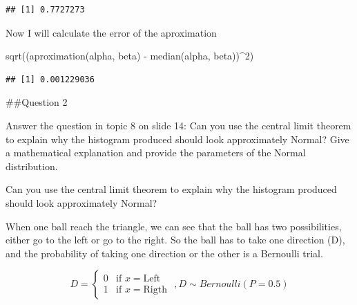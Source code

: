 \documentclass[
]{article}
\newenvironment{Shaded}{\begin{snugshade}}{\end{snugshade}}
\newcommand{\DecValTok}[1]{\textcolor[rgb]{0.00,0.00,0.81}{#1}}
\newcommand{\FunctionTok}[1]{\textcolor[rgb]{0.00,0.00,0.00}{#1}}
\newcommand{\NormalTok}[1]{#1}
\newcommand{\SpecialCharTok}[1]{\textcolor[rgb]{0.00,0.00,0.00}{#1}}
\begin{document}
\begin{verbatim}
## [1] 0.7727273
\end{verbatim}

Now I will calculate the error of the aproximation

\begin{Shaded}
\begin{Highlighting}[]
\FunctionTok{sqrt}\NormalTok{((}\FunctionTok{aproximation}\NormalTok{(alpha, beta) }\SpecialCharTok{{-}} \FunctionTok{median}\NormalTok{(alpha, beta))}\SpecialCharTok{\^{}}\DecValTok{2}\NormalTok{) }
\end{Highlighting}
\end{Shaded}

\begin{verbatim}
## [1] 0.001229036
\end{verbatim}

\#\#Question 2

Answer the question in topic 8 on slide 14: Can you use the central
limit theorem to explain why the histogram produced should look
approximately Normal? Give a mathematical explanation and provide the
parameters of the Normal distribution.

Can you use the central limit theorem to explain why the histogram
produced should look approximately Normal?

When one ball reach the triangle, we can see that the ball has two
possibilities, either go to the left or go to the right. So the ball has
to take one direction (D), and the probability of taking one direction
or the other is a Bernoulli trial.

\[ 
D=\left\{ \begin{array}{ll} 0 & \text{if }x = \text{Left } \\  
1 & \text{if }x = \text{Rigth }
\end{array}
\right. ,  D ∼ Bernoulli(P = 0.5)
\]
\end{document}

